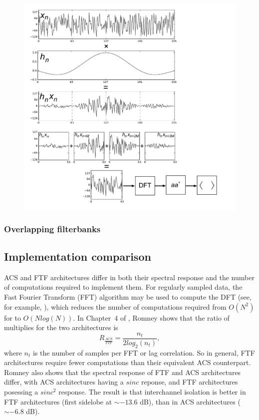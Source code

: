 \documentclass{ws-rv961x669}
\begin{document}
\begin{figure}
 \centering
 \includegraphics[width=\textwidth]{./figures/pfb_chart}
 \label{fig:pfb_chart}
 \caption{}
\end{figure}

\subsubsection{Overlapping filterbanks}

\subsection{Implementation comparison}

ACS and FTF architectures differ in both their spectral response and the number of computations required to implement them. For regularly
sampled data, the Fast Fourier Transform (FFT) algorithm may be used to compute the DFT (see, for example, \citep{BookBrighamFFT}),
which reduces the number of computations required from $O(N^{2})$ for to $O(Nlog(N))$. In Chapter~4 of \citep{Taylor1999}, Romney
shows that the ratio of multiplies for the two architectures is 
\begin{equation}
R_{\frac{ACS}{FTF}}=\frac{n_{t}}{\mbox{2}log_{2}(n_{t})},
\end{equation}
where $n_{t}$ is the number of samples per FFT or lag correlation. So in general, FTF architectures require fewer computations than their equivalent ACS counterpart. Romney also shows that the spectral response of FTF and ACS architectures differ, with ACS architectures having a $sinc$ reponse, and FTF architectures posessing a $sinc^{2}$ response. The result is that interchannel isolation is better in FTF architectures (first sidelobe at $\sim-\mbox{13.6}$ dB), than in ACS architectures ($\sim-\mbox{6.8}$ dB). 
\end{document}
